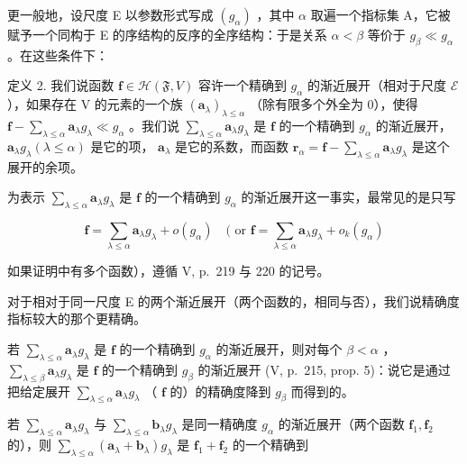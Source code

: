 更一般地，设尺度 E 以参数形式写成 \((g_{\alpha})\) ，其中 \(\alpha\) 取遍一个指标集 A，它被赋予一个同构于 E 的序结构的反序的全序结构：于是关系 \(\alpha < \beta\) 等价于 \(g_{\beta} \ll g_{\alpha}\) 。在这些条件下：

定义 2. 我们说函数 \(\mathbf{f} \in \mathcal{H}(\mathfrak{F}, V)\) 容许一个精确到 \(g_{\alpha}\) 的渐近展开（相对于尺度 \(\mathcal{E}\) ），如果存在 V 的元素的一个族 \((\mathbf{a}_{\lambda})_{\lambda \leqslant \alpha}\) （除有限多个外全为 0），使得 \(\mathbf{f} - \sum_{\lambda \leqslant \alpha} \mathbf{a}_{\lambda} g_{\lambda} \ll g_{\alpha}\) 。我们说 \(\sum_{\lambda \leqslant \alpha} \mathbf{a}_{\lambda} g_{\lambda}\) 是 \(\mathbf{f}\) 的一个精确到 \(g_{\alpha}\) 的渐近展开， \(\mathbf{a}_{\lambda} g_{\lambda} (\lambda \leqslant \alpha)\) 是它的项， \(\mathbf{a}_{\lambda}\) 是它的系数，而函数 \(\mathbf{r}_{\alpha} = \mathbf{f} - \sum_{\lambda \leqslant \alpha} \mathbf{a}_{\lambda} g_{\lambda}\) 是这个展开的余项。

为表示 \(\sum_{\lambda \leqslant \alpha} \mathbf{a}_{\lambda} g_{\lambda}\) 是 \(\mathbf{f}\) 的一个精确到 \(g_{\alpha}\) 的渐近展开这一事实，最常见的是只写

\[
\mathbf {f} = \sum_ {\lambda \leqslant \alpha} \mathbf {a} _ {\lambda} g _ {\lambda} + o (g _ {\alpha}) \quad (\text { or } \mathbf {f} = \sum_ {\lambda \leqslant \alpha} \mathbf {a} _ {\lambda} g _ {\lambda} + o _ {k} (g _ {\alpha})
\]

如果证明中有多个函数），遵循 V, p.~219 与 220 的记号。

对于相对于同一尺度 E 的两个渐近展开（两个函数的，相同与否），我们说精确度指标较大的那个更精确。

若 \(\sum_{\lambda \leqslant \alpha} \mathbf{a}_{\lambda} g_{\lambda}\) 是 \(\mathbf{f}\) 的一个精确到 \(g_{\alpha}\) 的渐近展开，则对每个 \(\beta < \alpha\) ， \(\sum_{\lambda \leqslant \beta} \mathbf{a}_{\lambda} g_{\lambda}\) 是 \(\mathbf{f}\) 的一个精确到 \(g_{\beta}\) 的渐近展开 (V, p.~215, prop. 5)：说它是通过把给定展开 \(\sum_{\lambda \leqslant \alpha} \mathbf{a}_{\lambda} g_{\lambda}\) （ \(\mathbf{f}\) 的）的精确度降到 \(g_{\beta}\) 而得到的。

若 \(\sum_{\lambda \leqslant \alpha} \mathbf{a}_{\lambda} g_{\lambda}\) 与 \(\sum_{\lambda \leqslant \alpha} \mathbf{b}_{\lambda} g_{\lambda}\) 是同一精确度 \(g_{\alpha}\) 的渐近展开（两个函数 \(\mathbf{f}_1, \mathbf{f}_2\) 的），则 \(\sum_{\lambda \leqslant \alpha} (\mathbf{a}_{\lambda} + \mathbf{b}_{\lambda}) g_{\lambda}\) 是 \(\mathbf{f}_1 + \mathbf{f}_2\) 的一个精确到

